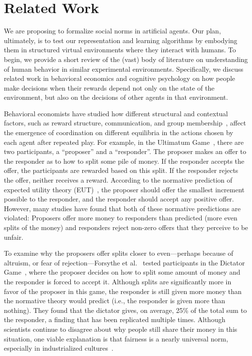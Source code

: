 
\section{Related Work}
\label{sec:related}

We are proposing to formalize social norms in artificial agents.  Our
plan, ultimately, is to test our representation and learning
algorithms by embodying them in structured virtual environments where
they interact with humans.  To begin, we provide a short review of the
(vast) body of literature on understanding of human behavior in
similar experimental environments.  Specifically, we discuss related
work in behavioral economics and cognitive psychology on how people
make decisions when their rewards depend not only on the state of the
environment, but also on the decisions of other agents in that
environment.

Behavioral economists have studied how different structural and
contextual factors, such as reward structure, communication, and group
membership~\cite{Camerer:2003}, affect the emergence of coordination
on different equilibria in the actions chosen by each agent after
repeated play. For example, in the Ultimatum Game~\cite{guth82}, there
are two participants, a ``proposer'' and a ``responder''. The proposer
makes an offer to the responder as to how to split some pile of
money. If the responder accepts the offer, the participants are
rewarded based on this split. If the responder rejects the offer,
neither receives a reward. According to the normative prediction of
expected utility theory (EUT)~\cite{vonneumann44}, the proposer should
offer the smallest increment possible to the responder, and the
responder should accept any positive offer. However, many studies have
found that both of these normative predictions are violated: Proposers
offer more money to responders than predicted (more even splits of the
money) and responders reject non-zero offers that they perceive to be
unfair.

To examine why the proposers offer splits closer to even---perhaps
because of altruism, or fear of rejection---Forsythe et
al.~\cite{forsythe94} tested participants in the Dictator
Game~\cite{kahneman86}, where the proposer decides on how to split
some amount of money and the responder is forced to accept
it. Although splits are significantly more in favor of the proposer in
this game, the responder is still given more money than the normative
theory would predict (i.e., the responder is given more than
nothing). They found that the dictator gives, on average, 25\% of the
total sum to the responder, a finding that has been replicated
multiple times. Although scientists continue to disagree about why
people still share their money in this situation,
one viable explanation is that fairness is a nearly universal norm,
especially in industrialized cultures~\cite{henrich05}.

